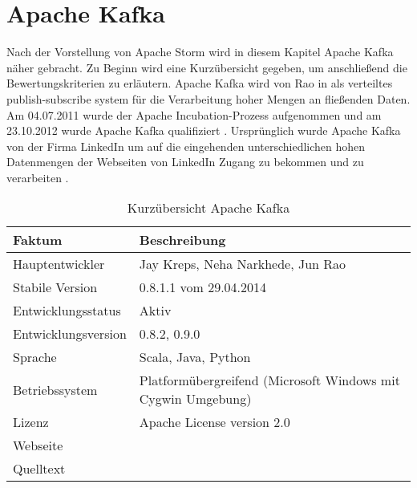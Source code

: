 \section{Apache Kafka}

Nach der Vorstellung von Apache Storm wird in diesem Kapitel Apache Kafka näher gebracht. Zu Beginn wird eine Kurzübersicht gegeben, um anschließend die Bewertungskriterien zu erläutern. Apache Kafka wird von Rao in  als verteiltes publish-subscribe system für die Verarbeitung hoher Mengen an fließenden Daten. Am 04.07.2011 wurde der Apache Incubation-Prozess aufgenommen und am 23.10.2012 wurde Apache Kafka qualifiziert . Ursprünglich wurde Apache Kafka von der Firma LinkedIn  um auf die eingehenden unterschiedlichen hohen Datenmengen der Webseiten von LinkedIn Zugang zu bekommen und zu verarbeiten .

\begin{table}[htbp]
	\centering
		\begin{tabular}{@{}ll@{}} \toprule
			\textbf{Faktum} & \textbf{Beschreibung} \\ \midrule
			Hauptentwickler & Jay Kreps, Neha Narkhede, Jun Rao \\
			Stabile Version & 0.8.1.1 vom 29.04.2014 \\ 
			Entwicklungsstatus &  Aktiv \\
			Entwicklungsversion & 0.8.2, 0.9.0 \\
			Sprache & Scala, Java, Python \\
			Betriebssystem & Platformübergreifend (Microsoft Windows mit Cygwin Umgebung) \\
			Lizenz & Apache License version 2.0 \\
			Webseite & \citeint{kafka:home} \\
			Quelltext & \citeint{kafka:GitHubApacheMirror} \\			
			\bottomrule			
		\end{tabular}
	\caption{Kurzübersicht Apache Kafka}
	\label{tab:vorkafka}
\end{table}

